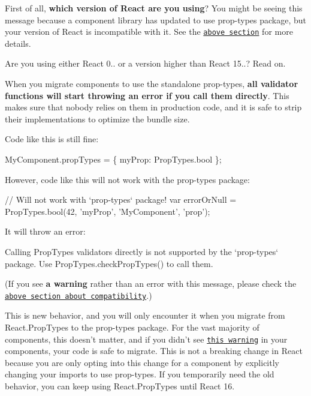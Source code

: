 First of all, {\bfseries which version of React are you using}? You might be seeing this message because a component library has updated to use {\ttfamily prop-\/types} package, but your version of React is incompatible with it. See the \href{#compatibility}{\tt above section} for more details.

Are you using either React 0.. or a version higher than React 15..? Read on.

When you migrate components to use the standalone {\ttfamily prop-\/types}, {\bfseries all validator functions will start throwing an error if you call them directly}. This makes sure that nobody relies on them in production code, and it is safe to strip their implementations to optimize the bundle size.

Code like this is still fine\+:


\begin{DoxyCode}
MyComponent.propTypes = \{
  myProp: PropTypes.bool
\};
\end{DoxyCode}


However, code like this will not work with the {\ttfamily prop-\/types} package\+:


\begin{DoxyCode}
// Will not work with `prop-types` package!
var errorOrNull = PropTypes.bool(42, 'myProp', 'MyComponent', 'prop');
\end{DoxyCode}


It will throw an error\+:


\begin{DoxyCode}
Calling PropTypes validators directly is not supported by the `prop-types` package.
Use PropTypes.checkPropTypes() to call them.
\end{DoxyCode}


(If you see {\bfseries a warning} rather than an error with this message, please check the \href{#compatibility}{\tt above section about compatibility}.)

This is new behavior, and you will only encounter it when you migrate from {\ttfamily React.\+Prop\+Types} to the {\ttfamily prop-\/types} package. For the vast majority of components, this doesn’t matter, and if you didn’t see \href{https://facebook.github.io/react/warnings/dont-call-proptypes.html}{\tt this warning} in your components, your code is safe to migrate. This is not a breaking change in React because you are only opting into this change for a component by explicitly changing your imports to use {\ttfamily prop-\/types}. If you temporarily need the old behavior, you can keep using {\ttfamily React.\+Prop\+Types} until React 16.

